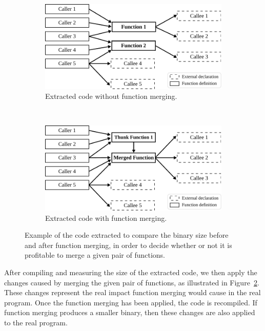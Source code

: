 \begin{figure}[h]
\centering
\begin{subfigure}{\textwidth}
  \centering
  \includegraphics[scale=0.8]{src/deeplearning/figs/our-cost-model-callgraph-1.pdf}
  \caption{Extracted code without function merging.}
  \label{fig:our-cost-model-callgraph-1}
\end{subfigure}
\\
\begin{subfigure}{\textwidth}
\centering
  \includegraphics[scale=0.8]{src/deeplearning/figs/our-cost-model-callgraph-2.pdf}
  \caption{Extracted code with function merging.}
  \label{fig:our-cost-model-callgraph-2}
\end{subfigure}
\caption{Example of the code extracted to compare the binary size before and after function merging, in order to decide whether or not it is profitable to merge a given pair of functions.}
\label{fig:our-cost-model-callgraphs}
\end{figure}

After compiling and measuring the size of the extracted code, we then apply the changes caused by merging the given pair of functions, as illustrated in Figure~\ref{fig:our-cost-model-callgraph-2}.
These changes represent the real impact function merging would cause in the real program.
Once the function merging has been applied, the code is recompiled.
If function merging produces a smaller binary, then these changes are also applied to the real program.

